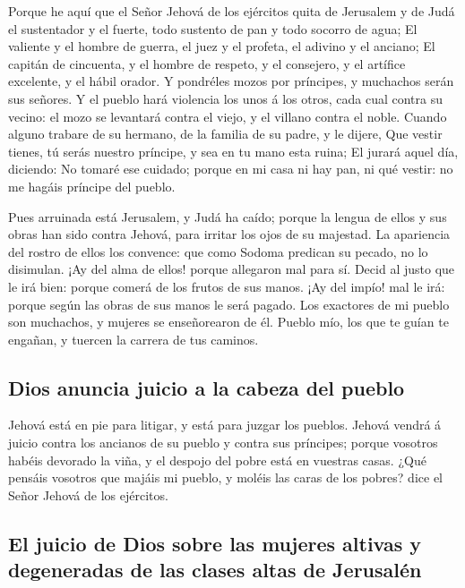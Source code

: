  Porque he aquí que el Señor Jehová de los ejércitos quita
de Jerusalem y de Judá el sustentador y el fuerte, todo sustento de pan
y todo socorro de agua;  El valiente y el hombre de
guerra, el juez y el profeta, el adivino y el anciano;  El
capitán de cincuenta, y el hombre de respeto, y el consejero, y el
artífice excelente, y el hábil orador.  Y pondréles mozos
por príncipes, y muchachos serán sus señores.  Y el pueblo
hará violencia los unos á los otros, cada cual contra su vecino: el mozo
se levantará contra el viejo, y el villano contra el noble.
 Cuando alguno trabare de su hermano, de la familia de su
padre, y le dijere, Que vestir tienes, tú serás nuestro príncipe, y sea
en tu mano esta ruina;  El jurará aquel día, diciendo: No
tomaré ese cuidado; porque en mi casa ni hay pan, ni qué vestir: no me
hagáis príncipe del pueblo.

 Pues arruinada está Jerusalem, y Judá ha caído; porque la
lengua de ellos y sus obras han sido contra Jehová, para irritar los
ojos de su majestad.  La apariencia del rostro de ellos
los convence: que como Sodoma predican su pecado, no lo disimulan. ¡Ay
del alma de ellos! porque allegaron mal para sí.  Decid
al justo que le irá bien: porque comerá de los frutos de sus manos.
 ¡Ay del impío! mal le irá: porque según las obras de sus
manos le será pagado.  Los exactores de mi pueblo son
muchachos, y mujeres se enseñorearon de él. Pueblo mío, los que te guían
te engañan, y tuercen la carrera de tus caminos.

\hypertarget{dios-anuncia-juicio-a-la-cabeza-del-pueblo}{%
\subsection{Dios anuncia juicio a la cabeza del
pueblo}\label{dios-anuncia-juicio-a-la-cabeza-del-pueblo}}

 Jehová está en pie para litigar, y está para juzgar los
pueblos.  Jehová vendrá á juicio contra los ancianos de
su pueblo y contra sus príncipes; porque vosotros habéis devorado la
viña, y el despojo del pobre está en vuestras casas. 
¿Qué pensáis vosotros que majáis mi pueblo, y moléis las caras de los
pobres? dice el Señor Jehová de los ejércitos.

\hypertarget{el-juicio-de-dios-sobre-las-mujeres-altivas-y-degeneradas-de-las-clases-altas-de-jerusaluxe9n}{%
\subsection{El juicio de Dios sobre las mujeres altivas y degeneradas de
las clases altas de
Jerusalén}\label{el-juicio-de-dios-sobre-las-mujeres-altivas-y-degeneradas-de-las-clases-altas-de-jerusaluxe9n}}


